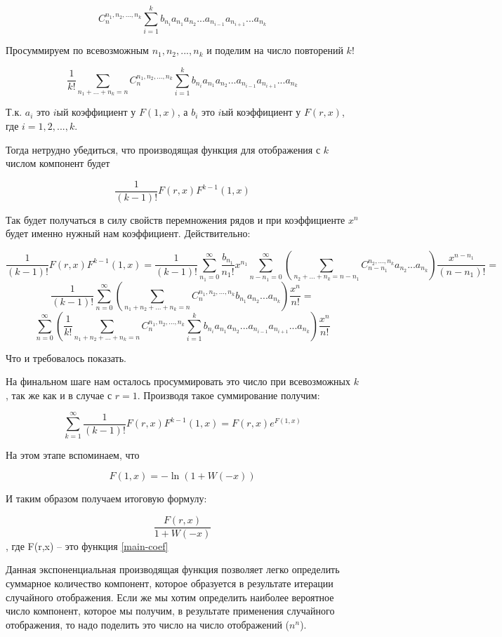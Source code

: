 \documentclass[10pt, a4paper]{report}
\renewcommand{\log}{\ln}
\begin{document}
$$
C_n^{n_1,n_2,...,n_k}\sum_{i=1}^{k} b_{n_i} a_{n_1} a_{n_2}...a_{n_{i-1}}a_{n_{i+1}}...a_{n_k}
$$

Просуммируем по всевозможным $n_1, n_2, ..., n_k$ и поделим на число повторений $k!$

$$
\frac 1 {k!}\sum_{n_1+...+n_k=n}C_n^{n_1,n_2,...,n_k}\sum_{i=1}^{k} b_{n_i} a_{n_1} a_{n_2}...a_{n_{i-1}}a_{n_{i+1}}...a_{n_k}
$$

Т.к. $a_i$ это $i$ый коэффициент у $F(1,x)$, а $b_i$ это $iый$ коэффициент у $F(r,x)$, где $i=1,2,...,k$.

Тогда нетрудно убедиться, что производящая функция для отображения с $k$ числом компонент будет 

$$\frac 1 {(k-1)!} F(r,x)F^{k-1}(1,x)$$

Так будет получаться в силу свойств перемножения рядов и при коэффициенте $x^n$ будет именно нужный нам коэффициент. Действительно:

$$
\frac 1 {(k-1)!} F(r,x)F^{k-1}(1,x) = \frac 1 {(k-1)!}  \sum_{n_1=0}^{\infty} \frac{b_{n_1}}{n_1!} x^{n_1}\sum_{n-n_1=0}^\infty\left(\sum_{n_2+...+n_k=n-n_1} C_{n-n_1}^{n_2,...,n_k} a_{n_2}...a_{n_k}\right)\frac {x^{n-n_1}}{(n-n_1)!}=
$$
$$
\frac 1 {(k-1)!}  \sum_{n=0}^\infty\left(\sum_{n_1+n_2+...+n_k=n} C_{n}^{n_1, n_2,...,n_k} b_{n_1}a_{n_2}...a_{n_k}\right)\frac {x^n}{n!}=
$$
$$
 \sum_{n=0}^\infty \left( \frac 1 {k!} \sum_{n_1+n_2+...+n_k=n} C_{n}^{n_1, n_2,...,n_k} \sum_{i=1}^{k}b_{n_i} a_{n_1} a_{n_2}...a_{n_{i-1}}a_{n_{i+1}}...a_{n_k}\right)\frac {x^n}{n!}
$$

Что и требовалось показать.

На финальном шаге нам осталось просуммировать это число при всевозможных $k$, так же как и в случае с $r=1$. Производя такое суммирование получим:

$$\sum_{k=1}^{\infty}\frac 1 {(k-1)!} F(r,x)F^{k-1}(1,x) = F(r,x)e^{F(1,x)}$$

На этом этапе вспоминаем, что 

$$
F(1,x) = -\log(1+W(-x))
$$

И таким образом получаем итоговую формулу:

$$
\frac{F(r,x)}{1+W(-x)}
$$, где F(r,x) -- это функция \eqref{main-coef}

Данная экспоненциальная производящая функция позволяет легко определить суммарное количество компонент, которое образуется в результате итерации случайного отображения. Если же мы хотим определить наиболее вероятное число компонент, которое мы получим, в результате применения случайного отображения, то надо поделить это число на число отображений ($n^n$). 
\end{document}

